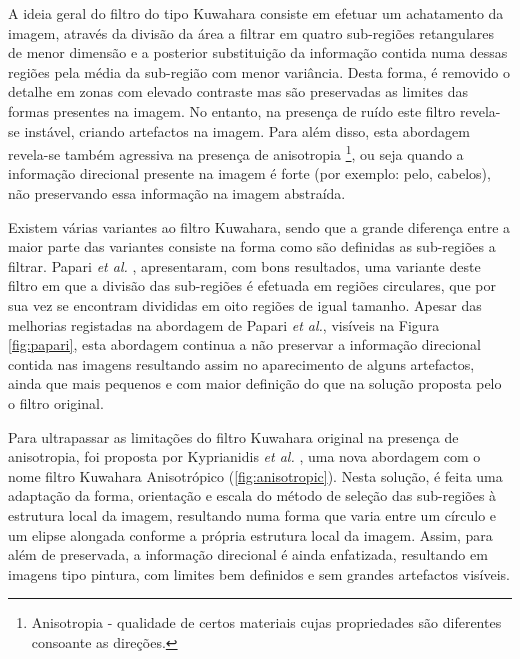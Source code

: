 A ideia geral do filtro do tipo Kuwahara consiste em efetuar um achatamento da imagem, através da divisão da área a filtrar em quatro sub-regiões retangulares de menor dimensão e a posterior substituição da informação contida numa dessas regiões pela média da sub-região com menor variância. Desta forma, é removido o detalhe em zonas com elevado contraste mas são preservadas as limites das formas presentes na imagem. No entanto, na presença de ruído este filtro revela-se instável, criando artefactos na imagem. Para além disso, esta abordagem revela-se também agressiva na presença de anisotropia \footnote{Anisotropia - qualidade de certos materiais cujas propriedades são diferentes consoante as direções.}, ou seja quando a informação direcional presente na imagem é forte (por exemplo: pelo, cabelos), não preservando essa informação na imagem abstraída.

Existem várias variantes ao filtro Kuwahara, sendo que a grande diferença entre a maior parte das variantes consiste na forma como são definidas as sub-regiões a filtrar. Papari \textit{et al.} \cite{Papari2007}, apresentaram, com bons resultados, uma variante deste filtro em que a divisão das sub-regiões é efetuada em regiões circulares, que por sua vez se encontram divididas em oito regiões de igual tamanho. Apesar das melhorias registadas na abordagem de Papari \textit{et al.}, visíveis na Figura \ref{fig:papari}, esta abordagem continua a não preservar a informação direcional contida nas imagens resultando assim no aparecimento de alguns artefactos, ainda que mais pequenos e com maior definição do que na solução proposta pelo o filtro original.

Para ultrapassar as limitações do filtro Kuwahara original na presença de anisotropia, foi proposta por Kyprianidis \textit{et al.} \cite{Kyprianidis2009}, uma nova abordagem com o nome filtro Kuwahara Anisotrópico (\ref{fig:anisotropic}). Nesta solução, é feita uma adaptação da forma, orientação e escala do método de seleção das sub-regiões à estrutura local da imagem, resultando numa forma que varia entre um círculo e um elipse alongada conforme a própria estrutura local da imagem. Assim, para além de preservada, a informação direcional é ainda enfatizada, resultando em imagens tipo pintura, com limites bem definidos e sem grandes artefactos visíveis.

